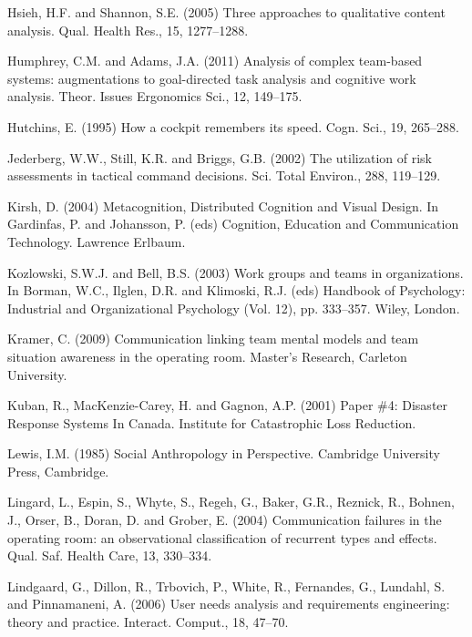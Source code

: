 \documentclass[link]{IWCOMP}
\begin{document}
\begin{thebibliography}{99}
Hsieh, H.F. and Shannon, S.E. (2005) Three
approaches to qualitative content analysis. Qual. Health
Res., 15, 1277--1288.

Humphrey, C.M. and Adams, J.A. (2011) Analysis of complex team-based systems: augmentations to goal-directed task analysis and cognitive work analysis. Theor. Issues Ergonomics Sci., 12, \hbox{149--175}.

Hutchins, E. (1995) How a cockpit remembers its speed. Cogn. Sci., 19, 265--288.

Jederberg, W.W., Still, K.R. and Briggs,
G.B. (2002) The utilization of risk assessments in tactical
command decisions. Sci. Total Environ., 288, 119--129.

Kirsh, D. (2004) Metacognition, Distributed
Cognition and Visual Design. In Gardinfas, P. and
Johansson, P. (eds) Cognition, Education and Communication
Technology. Lawrence Erlbaum.

Kozlowski, S.W.J. and Bell, B.S. (2003)
Work groups and teams in organizations. In Borman, W.C.,
Ilglen, D.R. and Klimoski, R.J. (eds) Handbook of
Psychology: Industrial and Organizational Psychology (Vol.
12), pp. 333--357. Wiley, London.

Kramer, C. (2009) Communication linking
team mental models and team situation awareness in the
operating room. Master's Research, Carleton University.

Kuban, R., MacKenzie-Carey, H. and Gagnon,
A.P. (2001) Paper {\#}4: Disaster Response Systems In
Canada. Institute for Catastrophic Loss Reduction.

Lewis, I.M. (1985) Social Anthropology in
Perspective. Cambridge University Press, Cambridge.

Lingard, L., Espin, S., Whyte, S.,
Regeh, G., Baker, G.R., Reznick, R., Bohnen, J., Orser, B.,
Doran, D. and Grober, E. (2004) Communication failures in
the operating room: an observational classification of
recurrent types and effects. Qual. Saf. Health Care, 13,
330--334.

Lindgaard, G., Dillon, R., Trbovich, P.,
White, R., Fernandes, G., Lundahl, S. and Pinnamaneni, A.
(2006) User needs analysis and requirements engineering:
theory and practice. Interact. Comput., 18, 47--70.


\end{thebibliography}
\end{document}

